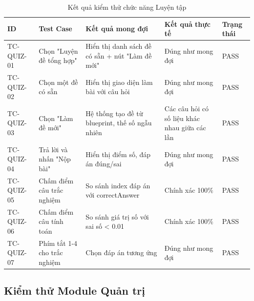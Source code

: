 \begin{table}[H]
\centering
\caption{Kết quả kiểm thử chức năng Luyện tập}
\begin{tabular}{|p{}|p{}|p{}|p{}|p{}|}
\hline
\textbf{ID} & \textbf{Test Case} & \textbf{Kết quả mong đợi} & \textbf{Kết quả thực tế} & \textbf{Trạng thái} \\
\hline
TC-QUIZ-01 & Chọn "Luyện đề tổng hợp" & Hiển thị danh sách đề có sẵn + nút "Làm đề mới" & Đúng như mong đợi & PASS \\
\hline
TC-QUIZ-02 & Chọn một đề có sẵn & Hiển thị giao diện làm bài với câu hỏi & Đúng như mong đợi & PASS \\
\hline
TC-QUIZ-03 & Chọn "Làm đề mới" & Hệ thống tạo đề từ blueprint, thế số ngẫu nhiên & Các câu hỏi có số liệu khác nhau giữa các lần & PASS \\
\hline
TC-QUIZ-04 & Trả lời và nhấn "Nộp bài" & Hiển thị điểm số, đáp án đúng/sai & Đúng như mong đợi & PASS \\
\hline
TC-QUIZ-05 & Chấm điểm câu trắc nghiệm & So sánh index đáp án với correctAnswer & Chính xác 100\% & PASS \\
\hline
TC-QUIZ-06 & Chấm điểm câu tính toán & So sánh giá trị số với sai số < 0.01 & Chính xác 100\% & PASS \\
\hline
TC-QUIZ-07 & Phím tắt 1-4 cho trắc nghiệm & Chọn đáp án tương ứng & Đúng như mong đợi & PASS \\
\hline
\end{tabular}
\end{table}

\subsection{Kiểm thử Module Quản trị}

